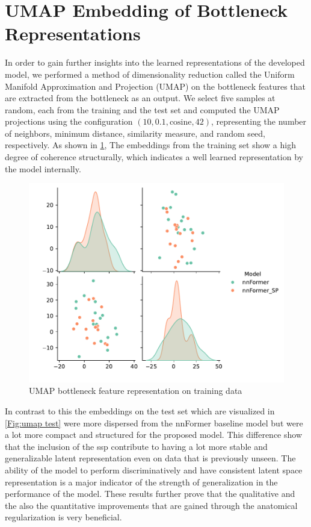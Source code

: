 \section{UMAP Embedding of Bottleneck Representations}
In order to gain further insights into the learned representations of the developed model, we performed a method of dimensionality reduction called the Uniform Manifold Approximation and Projection (UMAP) \cite{McInnes2018} on the bottleneck features that are extracted from the bottleneck as an output. We select five samples at random, each from the training and the test set and computed the UMAP projections using the configuration $(10, 0.1, \text{cosine}, 42)$, representing the number of neighbors, minimum distance, similarity measure, and random seed, respectively. As shown in \cref{Fig:umap train}, The embeddings from the training set show a high degree of coherence structurally, which indicates a well learned representation by the model internally. 

\begin{figure}[htb!] %
\centering
\centering
\includegraphics[width=1\textwidth]{images/Umap_train.pdf}
\caption{\centering UMAP bottleneck feature representation on training data}
\label{Fig:umap train}
\end{figure}

In contrast to this the embeddings on the test set which are visualized in \cref{Fig:umap test} were more dispersed from the nnFormer baseline model but were a lot more compact and structured for the proposed model. This difference show that the inclusion of the \gls{ssp} contribute to having a lot more stable and generalizable latent representation even on data that is previously unseen. The ability of the model to perform discriminatively and have consistent latent space representation is a major indicator of the strength of generalization in the performance of the model. These results further prove that the qualitative and the also the quantitative improvements that are gained through the anatomical regularization is very beneficial.


